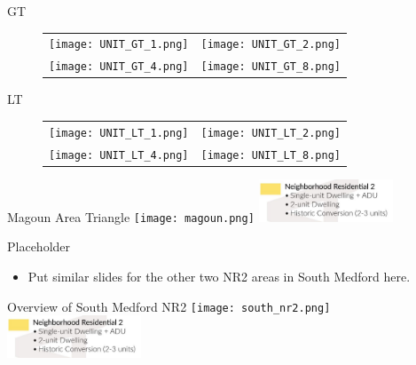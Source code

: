 \documentclass{beamer}
\begin{document}
\begin{frame}{GT}
    \begin{figure}[htb]
        \centering
        \begin{tabular}{cc}
            \texttt{[image: UNIT\_GT\_1.png]} &
            \texttt{[image: UNIT\_GT\_2.png]} \\
            \texttt{[image: UNIT\_GT\_4.png]} &
            \texttt{[image: UNIT\_GT\_8.png]}
        \end{tabular}
    \end{figure}
\end{frame}

\begin{frame}{LT}
    \begin{figure}[htb]
        \centering
        \begin{tabular}{cc}
            \texttt{[image: UNIT\_LT\_1.png]} &
            \texttt{[image: UNIT\_LT\_2.png]} \\
            \texttt{[image: UNIT\_LT\_4.png]} &
            \texttt{[image: UNIT\_LT\_8.png]}
        \end{tabular}
    \end{figure}
\end{frame}

\begin{frame}{Magoun Area Triangle}
    \centering
    \texttt{[image: magoun.png]}
    \hspace{0.5cm}
    \includegraphics[width=0.3\textwidth,height=0.3\textheight,keepaspectratio]{resources/20240115/NR2.png}
\end{frame}

\begin{frame}{Placeholder}
    \begin{itemize}
        \item Put similar slides for the other two NR2 areas in South Medford here.
    \end{itemize}
\end{frame}

\begin{frame}{Overview of South Medford NR2}
    \centering
    \texttt{[image: south\_nr2.png]}
    \hspace{0.5cm}
    \includegraphics[width=0.3\textwidth,height=0.3\textheight,keepaspectratio]{resources/20240115/NR2.png}
\end{frame}
\end{document}
